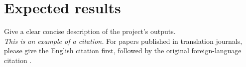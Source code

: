 \documentclass[conference, onecolumn]{IEEEtran}
\begin{document}
\section{Expected results}
Give a clear concise description of the project’s outputs.\\

\emph{This is an example of a citation.}
For papers published in translation journals, please give the English citation first, followed by the original foreign-language citation \cite{Nawaz2017, Ngo2020}.


\end{document}

